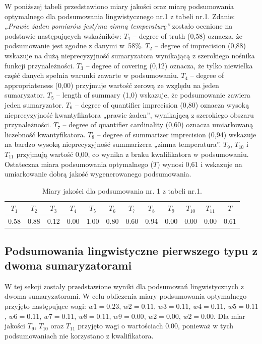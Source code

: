 \documentclass{article}
\begin{document}
W poniższej tabeli przedstawiono miary jakości oraz miarę podsumowania optymalnego dla podsumowania lingwistycznego nr.1 z tabeli nr.1. Zdanie: \textit{„Prawie żaden pomiarów jest/ma zimną temperaturę”} zostało ocenione na podstawie następujących wskaźników: \(T_1\) – degree of truth (0{,}58) oznacza, że podsumowanie jest zgodne z danymi w~58\%. \(T_2\) – degree of imprecision (0{,}88) wskazuje na dużą nieprecyzyjność sumaryzatora wynikającą z szerokiego nośnika funkcji przynależności. \(T_3\) – degree of covering (0{,}12) oznacza, że tylko niewielka część danych spełnia warunki zawarte w podsumowaniu. \(T_4\) – degree of appropriateness (0{,}00) przyjmuje wartość zerową ze względu na jeden sumaryzator. \(T_5\) – length of summary (1{,}0) wskazuje, że podsumowanie zawiera jeden sumaryzator. \(T_6\) – degree of quantifier imprecision (0{,}80) oznacza wysoką nieprecyzyjność kwantyfikatora „prawie żaden”, wynikającą z szerokiego obszaru przynależności. \(T_7\) – degree of quantifier cardinality (0{,}60) oznacza umiarkowaną liczebność kwantyfikatora. \(T_8\) – degree of summarizer imprecision (0{,}94) wskazuje na bardzo wysoką nieprecyzyjność summarizera „zimna temperatura”. \(T_9\), \(T_{10}\) i \(T_{11}\) przyjmują wartość 0{,}00, co wynika z braku kwalifikatora w podsumowaniu. Ostateczna miara podsumowania optymalnego (\(T\)) wynosi 0{,}61 i wskazuje na umiarkowanie dobrą jakość wygenerowanego podsumowania.


  \begin{table}[H]
    \centering
    \begin{tabular}{|c|c|c|c|c|c|c|c|c|c|c|c|}
    \hline
    \textbf{\(T_1\)} &\textbf{\(T_2\)} & \textbf{\(T_3\)} & \textbf{\(T_4\)} & \textbf{\(T_5\)} & \textbf{\(T_6\)} & \textbf{\(T_7\)} & \textbf{\(T_8\)} & \textbf{\(T_9\)} & \textbf{\(T_{10}\)} & \textbf{\(T_{11}\)} & \textbf{\(T\)} \\ \hline
    0.58 & 0.88 & 0.12 & 0.00 & 1.00 & 0.80 & 0.60 & 0.94 & 0.00 & 0.00 & 0.00 & 0.61 \\ \hline
    \end{tabular}
    \caption{Miary jakości dla podsumowania nr. 1 z tabeli nr.1.}
\end{table}  

\subsection{Podsumowania lingwistyczne pierwszego typu z dwoma sumaryzatorami}
W tej sekcji zostały przedstawione wyniki dla podsumowań lingwistycznych z dwoma sumaryzatorami.
W celu obliczenia miary podsumowania optymalnego przyjęto następujące wagi: \(w1 = 0.23\), \(w2 = 0.11\), \(w3 = 0.11\), \(w4 = 0.11\), \(w5 = 0.11\), \(w6 = 0.11\), \(w7 = 0.11\), \(w8 = 0.11\), \(w9 = 0.00\), \(w2 = 0.00\), \(w2 = 0.00\). Dla miar jakości \(T_9\), \(T_{10}\) oraz \(T_{11}\) przyjęto wagi o wartościach 0.00, ponieważ w tych podsumowaniach nie korzystano z kwalifikatora.
\end{document}
